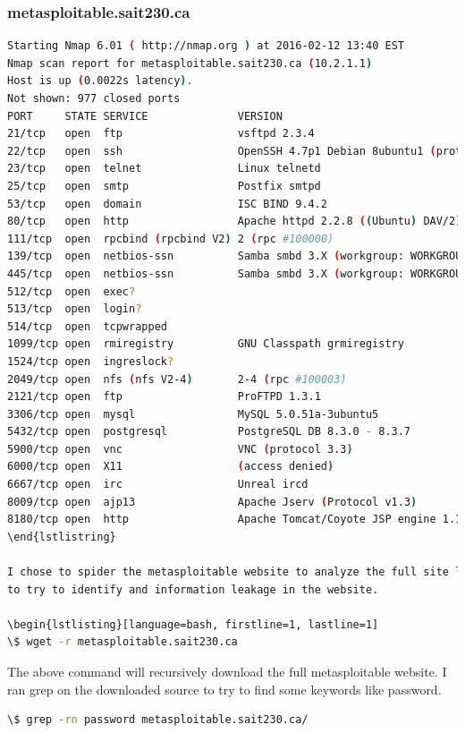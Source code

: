 \documentclass{article}
\begin{document}
\subsubsection{metasploitable.sait230.ca}

\begin{lstlisting}[language=bash]
Starting Nmap 6.01 ( http://nmap.org ) at 2016-02-12 13:40 EST
Nmap scan report for metasploitable.sait230.ca (10.2.1.1)
Host is up (0.0022s latency).
Not shown: 977 closed ports
PORT     STATE SERVICE              VERSION
21/tcp   open  ftp                  vsftpd 2.3.4
22/tcp   open  ssh                  OpenSSH 4.7p1 Debian 8ubuntu1 (protocol 2.0)
23/tcp   open  telnet               Linux telnetd
25/tcp   open  smtp                 Postfix smtpd
53/tcp   open  domain               ISC BIND 9.4.2
80/tcp   open  http                 Apache httpd 2.2.8 ((Ubuntu) DAV/2)
111/tcp  open  rpcbind (rpcbind V2) 2 (rpc #100000)
139/tcp  open  netbios-ssn          Samba smbd 3.X (workgroup: WORKGROUP)
445/tcp  open  netbios-ssn          Samba smbd 3.X (workgroup: WORKGROUP)
512/tcp  open  exec?
513/tcp  open  login?
514/tcp  open  tcpwrapped
1099/tcp open  rmiregistry          GNU Classpath grmiregistry
1524/tcp open  ingreslock?
2049/tcp open  nfs (nfs V2-4)       2-4 (rpc #100003)
2121/tcp open  ftp                  ProFTPD 1.3.1
3306/tcp open  mysql                MySQL 5.0.51a-3ubuntu5
5432/tcp open  postgresql           PostgreSQL DB 8.3.0 - 8.3.7
5900/tcp open  vnc                  VNC (protocol 3.3)
6000/tcp open  X11                  (access denied)
6667/tcp open  irc                  Unreal ircd
8009/tcp open  ajp13                Apache Jserv (Protocol v1.3)
8180/tcp open  http                 Apache Tomcat/Coyote JSP engine 1.1
\end{lstlistring}

I chose to spider the metasploitable website to analyze the full site locally 
to try to identify and information leakage in the website.

\begin{lstlisting}[language=bash, firstline=1, lastline=1]
\$ wget -r metasploitable.sait230.ca
\end{lstlisting}

The above command will recursively download the full metasploitable website. I ran grep
on the downloaded source to try to find some keywords like password.

\begin{lstlisting}[language=bash]
\$ grep -rn password metasploitable.sait230.ca/
\end{lstlisting}
\end{document}
